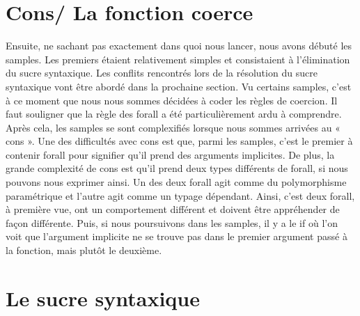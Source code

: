 \documentclass[12pt,a4paper]{article}
\begin{document}
\section*{Cons/ La fonction coerce}
Ensuite, ne sachant pas exactement dans quoi nous lancer, nous avons débuté les samples. Les premiers étaient relativement simples et consistaient à l’élimination du sucre syntaxique. Les conflits rencontrés lors de la résolution du sucre syntaxique vont être abordé dans la prochaine section. Vu certains samples, c’est à ce moment que nous nous sommes décidées à coder les règles de coercion. Il faut souligner que la règle des forall a été particulièrement ardu à comprendre. Après cela, les samples se sont complexifiés lorsque nous sommes arrivées au « cons ». Une des difficultés avec cons est que, parmi les samples, c’est le premier à contenir forall pour signifier qu’il prend des arguments implicites.  De plus, la grande complexité de cons est qu’il prend deux types différents de forall, si nous pouvons nous exprimer ainsi. Un des deux forall agit comme du polymorphisme paramétrique et l’autre agit comme un typage dépendant. Ainsi, c’est deux forall, à première vue, ont un comportement différent et doivent être appréhender de façon différente. Puis, si nous poursuivons dans les samples, il y a le if où l’on voit que l’argument implicite ne se trouve pas dans le premier argument passé à la fonction, mais plutôt le deuxième. 

\section*{Le sucre syntaxique}
\end{document}
